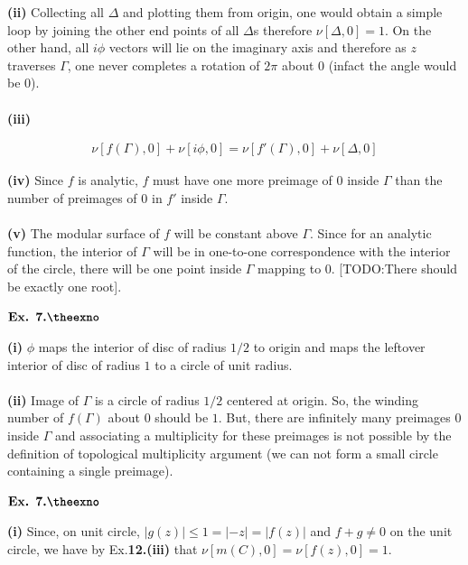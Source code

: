 \documentclass{article}
\def\tf{\textbf}
\newcounter{exno}
\begin{document}
\tf{(ii)} Collecting all $\Delta$ and plotting them from origin, one would obtain a simple loop by joining the other end points of all $\Delta$s therefore $\nu[\Delta,0] = 1$. On the other hand, all $i\phi$ vectors will lie on the imaginary axis and therefore as $z$ traverses $\Gamma$, one never completes a rotation of $2\pi$ about $0$ (infact the angle would be $0$).\\~\\

\tf{(iii)}

\begin{align*}
    \nu[f(\Gamma),0] + \nu[i\phi,0] = \nu[f'(\Gamma),0] + \nu[\Delta,0]
\end{align*}

\tf{(iv)} Since $f$ is analytic, $f$ must have one more preimage of $0$ inside $\Gamma$ than the number of preimages of $0$ in $f'$ inside $\Gamma$.\\~\\

\tf{(v)} The modular surface of $f$ will be constant above $\Gamma$. Since for an analytic function, the interior of $\Gamma$ will be in one-to-one correspondence with the interior of the circle, there will be one point inside $\Gamma$ mapping to $0$. [TODO:There should be exactly one root].

\vspace{0.2in}

${\textbf{Ex. 7.\theexno}}$
\addtocounter{exno}{1}

\tf{(i)} $\phi$ maps the interior of disc of radius $1/2$ to origin and maps the leftover interior of disc of radius $1$ to a circle of unit radius.\\~\\

\tf{(ii)} Image of $\Gamma$ is a circle of radius $1/2$ centered at origin. So, the winding number of $f(\Gamma)$ about $0$ should be $1$. But, there are infinitely many preimages $0$ inside $\Gamma$ and associating a multiplicity for these preimages is not possible by the definition of topological multiplicity argument (we can not form a small circle containing a single preimage).

\vspace{0.2in}

${\textbf{Ex. 7.\theexno}}$
\addtocounter{exno}{1}

\tf{(i)} Since, on unit circle, $|g(z)| \leq 1 = |-z| = |f(z)|$ and $f+g\neq 0$ on the unit circle, we have by Ex.\tf{12.(iii)} that $\nu[m(C),0] = \nu[f(z),0] = 1$.\\~\\
\end{document}
